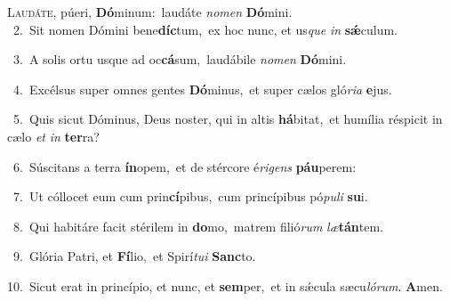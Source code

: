 \lettrine{\initial\textcolor{\initialcolor}{L}}{audáte,} púeri, \textbf{Dó}\-minum:~\star laudáte \textit{no}\-\textit{men} \textbf{Dó}\-mini.\\
{\numbfont\textcolor{\numbcolor}{~2.}}~Sit nomen Dómini bene\-\textbf{díc}\-tum,~\star ex hoc nunc, et us\textit{que} \textit{in} \textbf{sǽ}\-culum.\par
{\numbfont\textcolor{\numbcolor}{~3.}}~A solis ortu usque ad oc\-\textbf{cá}\-sum,~\star laudábile \textit{no}\-\textit{men} \textbf{Dó}\-mini.\par
{\numbfont\textcolor{\numbcolor}{~4.}}~Excélsus super omnes gentes \textbf{Dó}\-minus,~\star et super cælos gló\-\textit{ri}\-\textit{a} \textbf{e}\-jus.\par
{\numbfont\textcolor{\numbcolor}{~5.}}~Quis sicut Dóminus, Deus noster, qui in altis \textbf{há}\-bitat,~\star et humília réspicit in cælo \textit{et} \textit{in} \textbf{ter}\-ra?\par
{\numbfont\textcolor{\numbcolor}{~6.}}~Súscitans a terra \textbf{ín}\-opem,~\star et de stércore é\-\textit{ri}\-\textit{gens} \textbf{páu}\-perem:\par
{\numbfont\textcolor{\numbcolor}{~7.}}~Ut cóllocet eum cum prin\-\textbf{cí}\-pibus,~\star cum princípibus pó\-\textit{pu}\-\textit{li} \textbf{su}\-i.\par
{\numbfont\textcolor{\numbcolor}{~8.}}~Qui habitáre facit stérilem in \textbf{do}\-mo,~\star matrem filió\textit{rum} \textit{læ}\-\textbf{tán}tem.\par
{\numbfont\textcolor{\numbcolor}{~9.}}~Glória Patri, et \textbf{Fí}\-lio,~\star et Spirí\-\textit{tu}\-\textit{i} \textbf{Sanc}\-to.\par
{\numbfont\textcolor{\numbcolor}{10.}}~Sicut erat in princípio, et nunc, et \textbf{sem}\-per,~\star et in sǽcula sæcu\-\textit{ló}\-\textit{rum}. \textbf{A}\-men.\par
